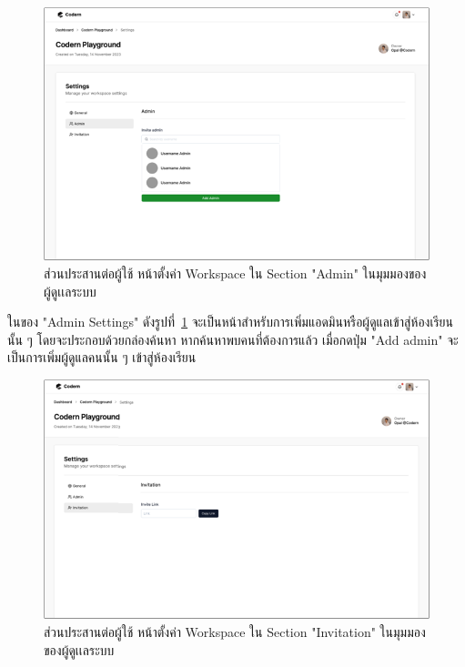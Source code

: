 \documentclass[12pt,one side,openright,a4paper]{cpe-thesis-th}
\newcommand{\thaijustify}[1]{%
  \par\hspace{30pt}\justifying
  #1
}
\begin{document}
    \hypertarget{ui-assign-settings2}{
        \begin{figure}[H]
        \centering
            \includegraphics[width=15cm]{figure/ui/ui-assign-settings2.png}
            \caption[ส่วนประสานต่อผู้ใช้ หน้าตั้งค่า Workspace ใน Section "Admin" ในมุมมองของผู้ดูเเลระบบ]{ส่วนประสานต่อผู้ใช้ หน้าตั้งค่า Workspace ใน Section "Admin" ในมุมมองของผู้ดูเเลระบบ}
            \label{fig:ui-assign-settings2}
        \end{figure}
    }
    \thaijustify{
        ในของ "Admin Settings" ดังรูปที่~\ref{fig:ui-assign-settings2} จะเป็นหน้าสำหรับการเพิ่มแอดมินหรือผู้ดูแลเข้าสู่ห้องเรียนนั้น ๆ โดยจะประกอบด้วยกล่องค้นหา หากค้นหาพบคนที่ต้องการแล้ว เมื่อกดปุ่ม "Add admin" จะเป็นการเพิ่มผู้ดูแลคนนั้น ๆ เข้าสู่ห้องเรียน
    }
    \hypertarget{ui-assign-settings3}{
        \begin{figure}[H]
        \centering
            \includegraphics[width=15cm]{figure/ui/ui-assign-settings3.png}
            \caption[ ส่วนประสานต่อผู้ใช้ หน้าตั้งค่า Workspace ใน Section "Invitation" ในมุมมองของผู้ดูเเลระบบ]{ ส่วนประสานต่อผู้ใช้ หน้าตั้งค่า Workspace ใน Section "Invitation" ในมุมมองของผู้ดูเเลระบบ}
            \label{fig:ui-assign-settings3}
        \end{figure}
    }
\end{document}
